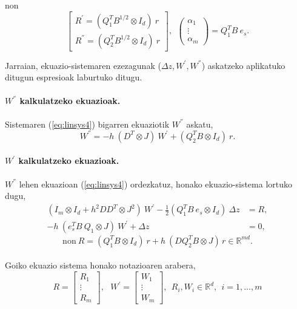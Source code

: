 non 
\begin{equation*}
\begin{bmatrix}
 R^{'}=(Q_1^{T}B^{1/2} \otimes I_d) \ r \\
 R^{''}=(Q_2^{T}B^{1/2} \otimes I_d) \ r
\end{bmatrix}, \ \
\left(
\begin{matrix}
\alpha_1 \\
\vdots \\
\alpha_m
\end{matrix}
\right)=Q_1^TB \ e_s.
\end{equation*}

Jarraian, ekuazio-sistemaren ezezagunak ($\Delta z,W^{'},W^{''}$) askatzeko aplikatuko ditugun espresioak laburtuko ditugu.

\paragraph*{$W^{''}$ kalkulatzeko ekuazioak.}

Sistemaren (\ref{eq:linsys4}) bigarren ekuaziotik $W^{''}$ askatu,
\begin{equation}
\label{eq:W''}
W^{''}= -h \ (D^T \otimes J) \ W^{'}+(Q_2^T B \otimes I_d) \ r.
\end{equation}

\paragraph*{$W^{'}$ kalkulatzeko ekuazioak.}

$W^{''}$ lehen ekuazioan (\ref{eq:linsys4}) ordezkatuz, honako ekuazio-sistema lortuko dugu,
\begin{align*}
(I_m \otimes I_d+ h^2DD^T \otimes J^2) \ W^{'}- \frac{1}{2}(Q_1^T B \ e_s \otimes I_d)\ \Delta z&=R, \\
- h \ (e_s^T B \ Q_1 \otimes J) \ W^{'} + \Delta z &=0,
\end{align*}
\begin{equation}
\label{eq:R}
\text{non} \ R=(Q_1^T B \otimes I_d) \ r + h \  ( D Q_2^T B \otimes J)\,  r \in \mathbb{R}^{md}.
\end{equation}

\paragraph*{}Goiko ekuazio sistema honako notazioaren arabera,  
\begin{equation*}
R=\begin{bmatrix}
R_1 \\
\vdots \\
R_m
\end{bmatrix}, \ \ \
W^{'}=\begin{bmatrix}
W_1 \\
\vdots \\
W_m
\end{bmatrix}, 
\ \ R_i,W_i \in \mathbb{R}^d, \ \ i=1,\dots,m  
\end{equation*}

